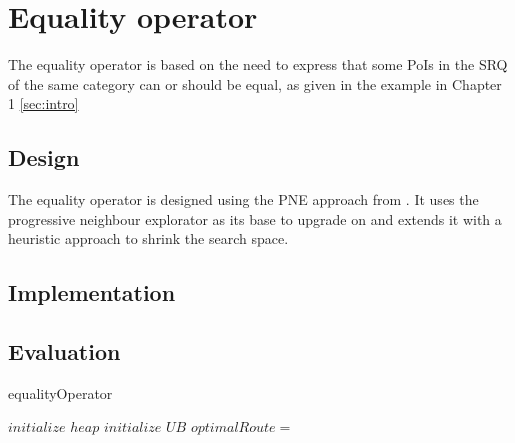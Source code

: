 \section{Equality operator}
The equality operator is based on the need to express that some PoIs in the SRQ of the same category can or should be equal, as given in the example in Chapter 1 \ref{sec:intro}

\subsection{Design} 
\label{sec:design}
The equality operator is designed using the PNE approach from \cite{OSR}. It uses the progressive neighbour explorator as  its base to upgrade on and extends it with a heuristic approach to shrink the search space. 

\subsection{Implementation}
\label{sec:implementation}

\subsection{Evaluation}
\label{sec:evaluation}




\begin{algorithm}
	\caption{equalityOperator}
	
	\BlankLine
	
	$initialize$ $heap$\; 
	$initialize$ $UB $\; 
	$optimalRoute =$ \;
	{
		\dummyPSR{}\;
		\modifiedPNE{}\;
	}
	
\end{algorithm}

